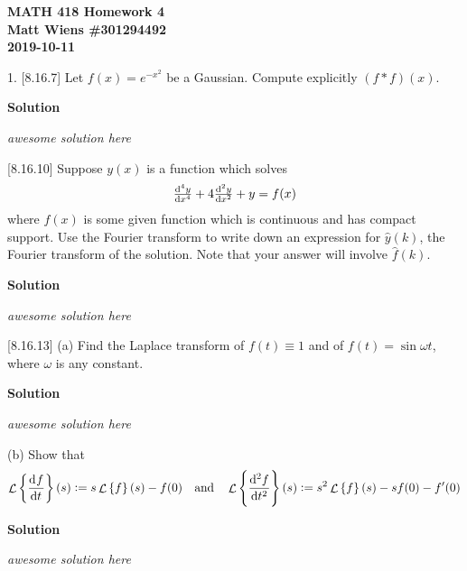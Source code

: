 \documentclass{article}
\DeclareMathOperator{\Lagr}{\mathcal{L}}
\begin{document}
\textbf{MATH 418 Homework 4} \\
\textbf{Matt Wiens \#301294492} \\
\textbf{2019-10-11}

1. [8.16.7] Let $f(x) = e^{-x^2}$ be a Gaussian. Compute explicitly $(f * f)(x)$.

\textbf{Solution}

\textit{awesome solution here}

\vspace{5mm}

[8.16.10] Suppose $y(x)$ is a function which solves
%
\begin{equation*}
    \od[4]{y}{x} + 4 \od[2]{y}{x} + y = f(x)
\end{equation*}
%
where $f(x)$ is some given function which is continuous and has compact
support. Use the Fourier transform to write down an expression for
$\hat{y}(k)$, the Fourier transform of the solution. Note that your
answer will involve $\hat{f}(k)$.

\textbf{Solution}

\textit{awesome solution here}

\vspace{5mm}

[8.16.13] (a) Find the Laplace transform of $f(t) \equiv 1$ and of
$f(t) = \sin \omega t$, where $\omega$ is any constant.

\textbf{Solution}

\textit{awesome solution here}

\vspace{5mm}

(b) Show that
%
\begin{equation*}
    \Lagr \left\{ \dod{f}{t} \right\}(s) \vcentcolon= s \Lagr \left\{ f \right\}(s) - f(0)
    \quad \text{and} \quad
    \Lagr \left\{ \dod[2]{f}{t} \right\}(s) \vcentcolon= s^2 \Lagr \left\{ f \right\}(s) - s f(0) - f^\prime(0)
\end{equation*}

\textbf{Solution}

\textit{awesome solution here}

\vspace{5mm}
\end{document}

